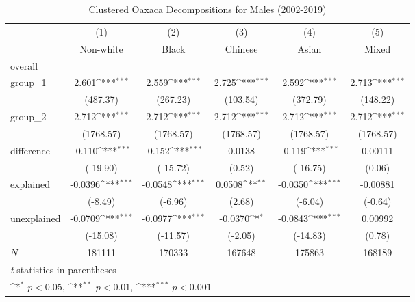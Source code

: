 \begin{table}[htbp]\centering
\def\sym#1{\ifmmode^{#1}\else\(^{#1}\)\fi}
\caption{Clustered Oaxaca Decompositions for Males (2002-2019)\label{tab1}}
\begin{tabular}{l*{5}{c}}
\hline\hline
            &\multicolumn{1}{c}{(1)}&\multicolumn{1}{c}{(2)}&\multicolumn{1}{c}{(3)}&\multicolumn{1}{c}{(4)}&\multicolumn{1}{c}{(5)}\\
            &\multicolumn{1}{c}{Non-white}&\multicolumn{1}{c}{Black}&\multicolumn{1}{c}{Chinese}&\multicolumn{1}{c}{Asian}&\multicolumn{1}{c}{Mixed}\\
\hline
overall     &                     &                     &                     &                     &                     \\
group\_1     &       2.601\sym{***}&       2.559\sym{***}&       2.725\sym{***}&       2.592\sym{***}&       2.713\sym{***}\\
            &    (487.37)         &    (267.23)         &    (103.54)         &    (372.79)         &    (148.22)         \\
group\_2     &       2.712\sym{***}&       2.712\sym{***}&       2.712\sym{***}&       2.712\sym{***}&       2.712\sym{***}\\
            &   (1768.57)         &   (1768.57)         &   (1768.57)         &   (1768.57)         &   (1768.57)         \\
difference  &      -0.110\sym{***}&      -0.152\sym{***}&      0.0138         &      -0.119\sym{***}&     0.00111         \\
            &    (-19.90)         &    (-15.72)         &      (0.52)         &    (-16.75)         &      (0.06)         \\
explained   &     -0.0396\sym{***}&     -0.0548\sym{***}&      0.0508\sym{**} &     -0.0350\sym{***}&    -0.00881         \\
            &     (-8.49)         &     (-6.96)         &      (2.68)         &     (-6.04)         &     (-0.64)         \\
unexplained &     -0.0709\sym{***}&     -0.0977\sym{***}&     -0.0370\sym{*}  &     -0.0843\sym{***}&     0.00992         \\
            &    (-15.08)         &    (-11.57)         &     (-2.05)         &    (-14.83)         &      (0.78)         \\
\hline
\(N\)       &      181111         &      170333         &      167648         &      175863         &      168189         \\
\hline\hline
\multicolumn{6}{l}{\footnotesize \textit{t} statistics in parentheses}\\
\multicolumn{6}{l}{\footnotesize \sym{*} \(p<0.05\), \sym{**} \(p<0.01\), \sym{***} \(p<0.001\)}\\
\end{tabular}
\label{tab:oaxaca_male_clustered}
\end{table}
